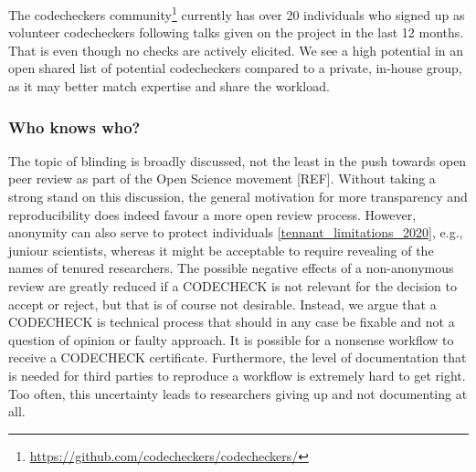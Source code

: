 \documentclass[12pt]{article}
\begin{document}
The codecheckers community\footnote{\href{https://github.com/codecheckers/codecheckers/}{https://github.com/codecheckers/codecheckers/}}
currently has over 20 individuals who signed up as volunteer codecheckers
following talks given on the project in the last 12 months.
That is even though no checks are actively elicited.
We see a high potential in an open shared list of potential codecheckers 
compared to a private, in-house group, as it may better match expertise
and share the workload.

\subsubsection*{Who knows who?}\label{who-knows-who}

The topic of blinding is broadly discussed, not the least in the push towards
open peer review as part of the Open Science movement [REF]. Without taking
a strong stand on this discussion, the general motivation for more 
transparency and reproducibility does indeed favour a more open review 
process. However, anonymity can also serve to protect individuals 
\ref{tennant_limitations_2020}, e.g.,  juniour scientists, whereas it might 
be acceptable to require revealing of the names of tenured researchers.
The possible negative effects of a non-anonymous review are greatly reduced
if a CODECHECK is not relevant for the decision to accept or reject, but that
is of course not desirable. Instead, we argue that a CODECHECK is technical
process that should in any case be fixable and not a question of opinion or
faulty approach. It is possible for a nonsense workflow to receive a 
CODECHECK certificate.
Furthermore, the level of documentation that is needed for third parties
to reproduce a workflow is extremely hard to get right. Too often, this 
uncertainty leads to researchers giving up and not documenting at all.
\end{document}
